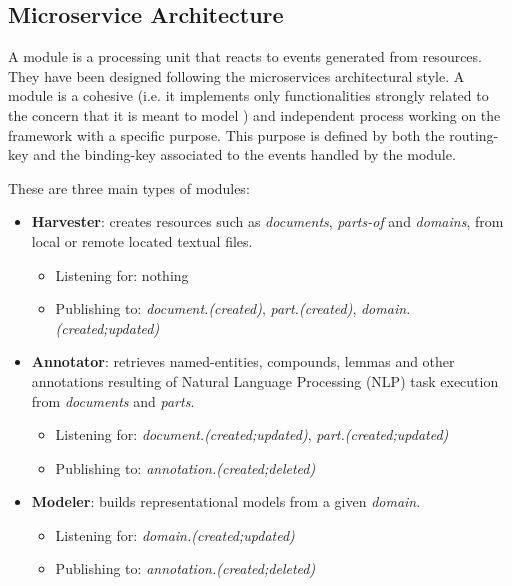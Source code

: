 \subsection{Microservice Architecture}
A module is a processing unit that reacts to events generated from resources. They have been designed following the microservices architectural style. A module is a cohesive (i.e. it implements only functionalities strongly related to the concern that it is meant to model \cite{Dragoni2016}) and independent process working on the framework with a specific purpose. This purpose is defined by both the routing-key and the binding-key associated to the events handled by the module. 

These are three main types of modules:
\begin{itemize}
	\item \textbf{Harvester}: creates resources such as \textit{documents}, \textit{parts-of} and \textit{domains}, from local or remote located textual files.
    \begin{itemize}[rightmargin=\dimexpr\linewidth-5cm-\leftmargin\relax]
    	\item Listening for: nothing
		\item Publishing to: \textit{document.(created)}, 
        \textit{part.(created)}, \textit{domain.(created;updated)}
    \end{itemize}
    \item \textbf{Annotator}: retrieves named-entities, compounds, lemmas and other annotations resulting of Natural Language Processing (NLP) task execution from \textit{documents} and \textit{parts}.
    \begin{itemize}[rightmargin=\dimexpr\linewidth-5cm-\leftmargin\relax]
    	\item Listening for: \textit{document.(created;updated)}, \textit{part.(created;updated)}
		\item Publishing to: \textit{annotation.(created;deleted)}
    \end{itemize}
    \item \textbf{Modeler}: builds representational models from a given \textit{domain}. 
    \begin{itemize}[rightmargin=\dimexpr\linewidth-5cm-\leftmargin\relax]
    	\item Listening for: \textit{domain.(created;updated)}
		\item Publishing to: \textit{annotation.(created;deleted)}
    \end{itemize}
\end{itemize}

